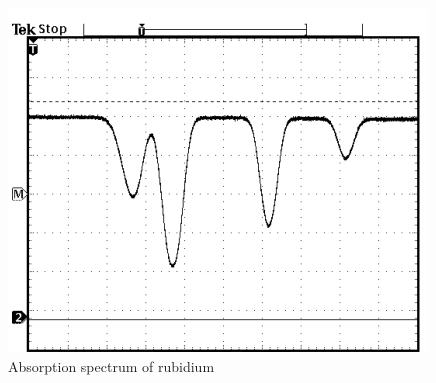 \begin{figure}
    \centering
    \includegraphics[width=\textwidth]{images/oszi2.png}
    \caption{Absorption spectrum of rubidium \cite{V60}}
    \label{fig:osci4}
\end{figure}